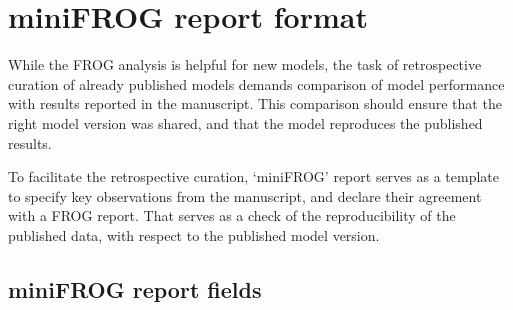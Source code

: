 
\chapter{miniFROG report format}
\label{chap:mini}

While the FROG analysis is helpful for new models, the task of retrospective curation of already published models demands comparison of model performance with results reported in the manuscript.
This comparison should ensure that the right model version was shared, and that the model reproduces the published results.

To facilitate the retrospective curation, `miniFROG' report serves as a template to specify key observations from the manuscript, and declare their agreement with a FROG report.
That serves as a check of the reproducibility of the published data, with respect to the published model version.

\section{miniFROG report fields}

